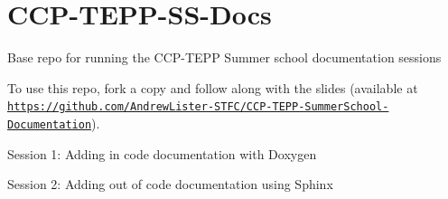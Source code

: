 \chapter{CCP-\/\+TEPP-\/\+SS-\/\+Docs }
\hypertarget{md__r_e_a_d_m_e}{}\label{md__r_e_a_d_m_e}
\label{md__r_e_a_d_m_e_autotoc_md0}%
%


Base repo for running the CCP-\/\+TEPP Summer school documentation sessions

To use this repo, fork a copy and follow along with the slides (available at \href{https://github.com/AndrewLister-STFC/CCP-TEPP-SummerSchool-Documentation}{\texttt{https:\+/\+/\+github.\+com/\+\+Andrew\+Lister-\/\+STFC/\+\+CCP-\/\+TEPP-\/\+Summer\+School-\/\+Documentation}}).

Session 1:\+ Adding in code documentation with Doxygen

Session 2:\+ Adding out of code documentation using Sphinx 